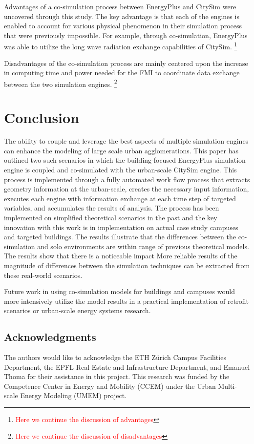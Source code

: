 \documentclass{tBPS2e}
\theoremstyle{plain}
\theoremstyle{definition}
\theoremstyle{remark}
\newcommand{\noteCM}[1]{\footnote{\textcolor{red}{#1}}}
\newcommand{\noteDT}[1]{\footnote{\textcolor{green}{#1}}}
\begin{document}
Advantages of a co-simulation process between EnergyPlus and CitySim were uncovered through
this study. The key advantage is that each of the engines is enabled to account for various 
physical phenomenon in their simulation process that were previously impossible. For example, 
through co-simulation, EnergyPlus was able to utilize the long wave radiation exchange capabilities 
of CitySim. \noteCM{Here we continue the discussion of advantages}

Disadvantages of the co-simulation process are mainly centered upon the increase
in computing time and power needed for the FMI to coordinate data exchange between 
the two simulation engines. \noteCM{Here we continue the discussion of disadvantages}


\section{Conclusion}
The ability to couple and leverage the best aspects of multiple simulation
engines can enhance the modeling of large scale urban agglomerations. This
paper has outlined two such scenarios in which the building-focused EnergyPlus
simulation engine is coupled and co-simulated with the urban-scale CitySim
engine. This process is implemented through a fully automated work flow
process that extracts geometry information at the
urban-scale, creates the necessary input information, executes each engine
with information exchange at each time step of targeted variables, and
accumulates the results of analysis. The process has been implemented on
simplified theoretical scenarios in the past and the key innovation with this
work is in implementation on actual case study campuses and targeted
buildings. The results illustrate that the differences between the co-
simulation and solo environments are within range of previous theoretical
models. The results show that there is a noticeable impact 
More reliable results of the magnitude of differences between the
simulation techniques can be extracted from these real-world scenarios. 

Future work in using co-simulation models for buildings and campuses would
more intensively utilize the model results in a practical implementation of
retrofit scenarios or urban-scale energy systems research.

\subsection{Acknowledgments}
The authors would like to acknowledge the ETH Z\"urich Campus Facilities
Department, the EPFL Real Estate and Infrastructure Department, and Emanuel
Thoma for their assistance in this project. This research was funded by the
Competence Center in Energy and Mobility (CCEM) under the Urban Multi-scale
Energy Modeling (UMEM) project. 



\end{document}
